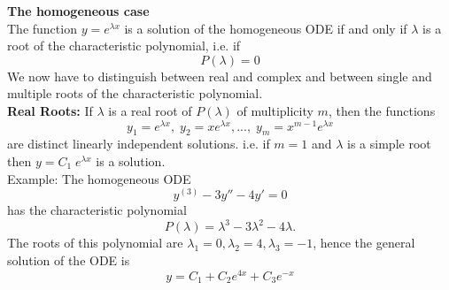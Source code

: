 \textbf{The homogeneous case}\\
The function $y = e^{\lambda x}$ is a solution of the homogeneous ODE if and only if $\lambda$ is a root of the characteristic polynomial, i.e. if
\begin{equation}
  P(\lambda) = 0
\end{equation}
We now have to distinguish between real and complex and between single and multiple roots of the characteristic polynomial.\\

\textbf{Real Roots:}
If $\lambda$ is a real root of $P(\lambda)$ of multiplicity $m$, then the functions
\begin{equation}
  y_1 =e^{\lambda x}, \;   y_2 =xe^{\lambda x} ,...,\;   y_m =x^{m-1}e^{\lambda x}
\end{equation}
are distinct linearly independent solutions. i.e. if $m = 1$ and $\lambda$ is a simple root then $y = C_1\; e^{\lambda x}$ is a solution.\\
Example: The homogeneous ODE
\begin{equation}
  y^{(3)}- 3y'' - 4y' = 0
\end{equation}
has the characteristic polynomial
\begin{equation}
  P(\lambda) = \lambda^3 - 3\lambda^2 - 4\lambda.
\end{equation}
The roots of this polynomial are $\lambda_1 = 0, \lambda_2 = 4, \lambda_3 = -1$, hence the general solution of
the ODE is
\begin{equation}
  y = C_1 + C_2 e^{4x} + C_3e^{-x}
\end{equation}

